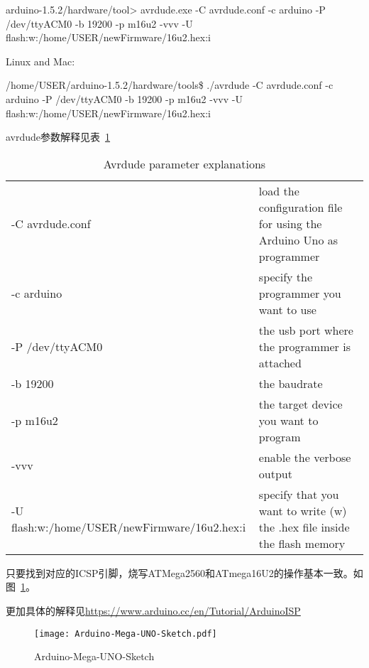 \begin{tcolorbox}
    arduino-1.5.2/hardware/tool> avrdude.exe -C avrdude.conf -c arduino -P /dev/ttyACM0 -b 19200 -p m16u2 -vvv -U flash:w:/home/USER/newFirmware/16u2.hex:i
\end{tcolorbox}

Linux and Mac:

\begin{tcolorbox}
    /home/USER/arduino-1.5.2/hardware/tools\$ ./avrdude -C avrdude.conf -c arduino -P /dev/ttyACM0 -b 19200 -p m16u2 -vvv -U flash:w:/home/USER/newFirmware/16u2.hex:i
\end{tcolorbox}

avrdude参数解释见表~\ref{tab:avrdude}

\begin{table}[htbp]
    \centering
    \begin{tabular}{ll}
    -C avrdude.conf                              & load the configuration file for using the Arduino Uno as programmer       \\
    -c arduino                                   & specify the programmer you want to use                                    \\
    -P /dev/ttyACM0                              & the usb port where the programmer is attached                             \\
    -b 19200                                     & the baudrate                                                              \\
    -p m16u2                                     & the target device you want to program                                     \\
    -vvv                                         & enable the verbose output                                                 \\
    -U flash:w:/home/USER/newFirmware/16u2.hex:i & specify that you want to write (w) the  .hex file inside the flash memory
    \end{tabular}
    \caption{Avrdude parameter explanations}
    \label{tab:avrdude}
\end{table}

只要找到对应的ICSP引脚，烧写ATMega2560和ATmega16U2的操作基本一致。如图~\ref{fig:Arduino-Mega-UNO-Sketch}。

更加具体的解释见\url{https://www.arduino.cc/en/Tutorial/ArduinoISP}

\begin{figure}[htbp]
    \centering
    \texttt{[image: Arduino-Mega-UNO-Sketch.pdf]}
    \caption{Arduino-Mega-UNO-Sketch}
    \label{fig:Arduino-Mega-UNO-Sketch}
\end{figure}

